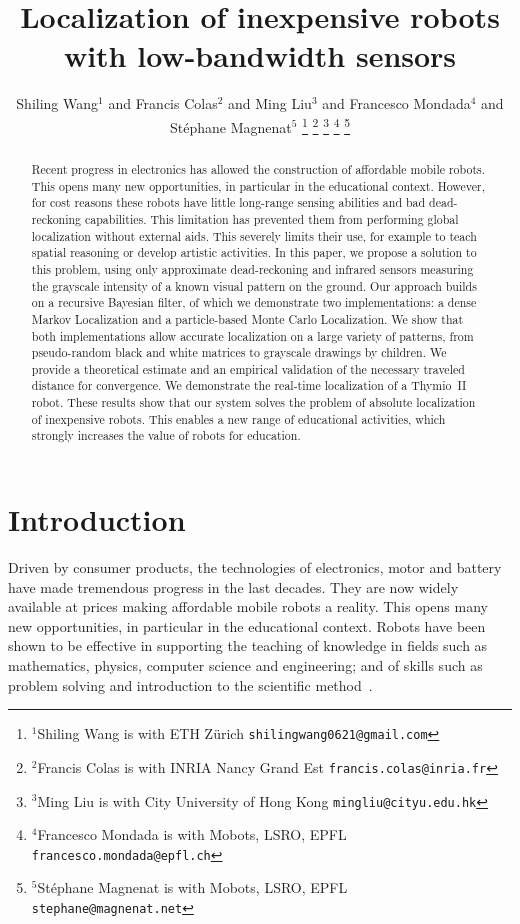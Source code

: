 \documentclass[letterpaper, 10pt, conference]{ieeeconf}
\title{\LARGE \bf
Localization of inexpensive robots with low-bandwidth sensors
}
\author{Shiling Wang$^{1}$ and Francis Colas$^{2}$ and Ming Liu$^{3}$ and Francesco Mondada$^{4}$ and Stéphane Magnenat$^{5}$%
\thanks{$^{1}$Shiling Wang is with ETH Zürich
        {\tt\small shilingwang0621@gmail.com}}%
\thanks{$^{2}$Francis Colas is with INRIA Nancy Grand Est
        {\tt\small francis.colas@inria.fr}}%
\thanks{$^{3}$Ming Liu is with City University of Hong Kong
        {\tt\small mingliu@cityu.edu.hk}}%
\thanks{$^{4}$Francesco Mondada is with Mobots, LSRO, EPFL
        {\tt\small francesco.mondada@epfl.ch}}%
\thanks{$^{5}$Stéphane Magnenat is with Mobots, LSRO, EPFL
        {\tt\small stephane@magnenat.net}}%
}
\begin{document}
\maketitle
\thispagestyle{empty}
\pagestyle{empty}

\begin{abstract}
Recent progress in electronics has allowed the construction of affordable mobile robots.
This opens many new opportunities, in particular in the educational context.
However, for cost reasons these robots have little long-range sensing abilities and bad dead-reckoning capabilities.
This limitation has prevented them from performing global localization without external aids.
This severely limits their use, for example to teach spatial reasoning or develop artistic activities.
In this paper, we propose a solution to this problem, using only approximate dead-reckoning and infrared sensors measuring the grayscale intensity of a known visual pattern on the ground.
Our approach builds on a recursive Bayesian filter, of which we demonstrate two implementations: a dense Markov Localization and a particle-based Monte Carlo Localization.
We show that both implementations allow accurate localization on a large variety of patterns, from pseudo-random black and white matrices to grayscale drawings by children.
We provide a theoretical estimate and an empirical validation of the necessary traveled distance for convergence.
We demonstrate the real-time localization of a Thymio~II robot.
These results show that our system solves the problem of absolute localization of inexpensive robots.
This enables a new range of educational activities, which strongly increases the value of robots for education.

\end{abstract}

\section{Introduction}

Driven by consumer products, the technologies of electronics, motor and battery have made tremendous progress in the last decades.
They are now widely available at prices making affordable mobile robots a reality.
This opens many new opportunities, in particular in the educational context.
Robots have been shown to be effective in supporting the teaching of knowledge in fields such as mathematics, physics, computer science and engineering; and of skills such as problem solving and introduction to the scientific method~\cite{benitti2012explorin, karim2015review}.
\end{document}
